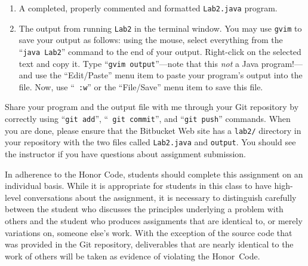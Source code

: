 \begin{enumerate}

	\item A completed, properly commented and formatted {\tt Lab2.java} program.

        \item The output from running {\tt Lab2} in the terminal window. You may use {\tt gvim} to save your output as
          follows: using the mouse, select everything from the ``{\tt java Lab2}'' command to the end of your output.
          Right-click on the selected text and copy it.  Type ``{\tt gvim output}''---note that this {\em not} a Java
          program!---and use the ``Edit/Paste'' menu item to paste your program's output into the file.  Now, use ``{\tt
          :w}'' or the ``File/Save'' menu item to save this file.

\end{enumerate}

Share your program and the output file with me through your Git repository by correctly using ``{\tt git add}'', ``{\tt
git commit}'', and ``{\tt git push}'' commands. When you are done, please ensure that the Bitbucket Web site has
a {\tt lab2/} directory in your repository with the two files called {\tt Lab2.java} and {\tt output}. You should see 
the instructor if you have questions about assignment submission.

In adherence to the Honor Code, students should complete this assignment on an individual basis. While it is appropriate
for students in this class to have high-level conversations about the assignment, it is necessary to distinguish
carefully between the student who discusses the principles underlying a problem with others and the student who produces
assignments that are identical to, or merely variations on, someone else's work.  With the exception of the source code
that was provided in the Git repository, deliverables that are nearly identical to the work of others will be taken as
evidence of violating the \mbox{Honor Code}.  


